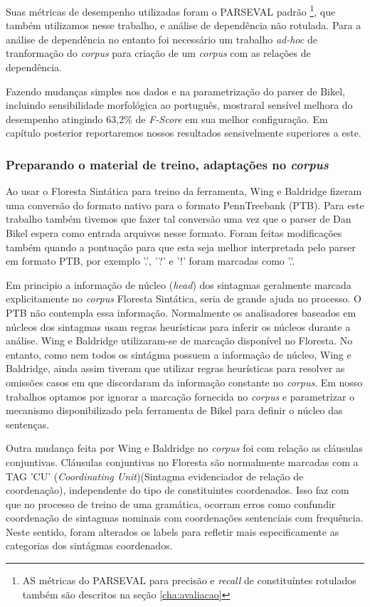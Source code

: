 Suas métricas de desempenho utilizadas foram o PARSEVAL padrão \footnote{AS métricas do PARSEVAL para precisão e \emph{recall} de constituíntes rotulados também são descritos na seção \ref{cha:avaliacao}}, que também utilizamos nesse trabalho, e análise de dependência não rotulada. Para a análise de dependência no entanto foi necessário um trabalho \emph{ad-hoc} de tranformação do \emph{corpus} para criação de um \emph{corpus} com as relações de dependência.

Fazendo mudanças simples nos dados e na parametrização do parser de Bikel, incluindo sensibilidade morfológica ao português, mostraral sensível melhora do desempenho atingindo 63,2{\%} de \emph{F-Score} em sua melhor configuração. Em capítulo posterior reportaremos nossos resultados sensivelmente superiores a este.


\subsubsection{Preparando o material de treino, adaptações no \emph{corpus}} %
\label{sec:wing_baldridge_adapt_corpus}

Ao usar o Floresta Sintática para treino da ferramenta, Wing e Baldridge fizeram uma conversão do formato nativo para o formato PennTreebank (PTB). Para este trabalho também tivemos que fazer tal conversão uma vez que o parser de Dan Bikel espera como entrada arquivos nesse formato. Foram feitas modificações também quando a pontuação para que esta seja melhor interpretada pelo parser em formato PTB, por exemplo '.', '?' e '!' foram marcadas como '.'. 

Em principio a informação de núcleo (\emph{head}) dos sintagmas geralmente marcada explicitamente no \emph{corpus} Floresta Sintática, seria de grande ajuda no processo. O PTB não contempla essa informação. Normalmente os analisadores baseados em núcleos dos sintagmas usam regras heurísticas para inferir os núcleos durante a análise. Wing e Baldridge utilizaram-se de marcação disponível no Floresta. No entanto, como nem todos os sintágma possuem a informação de núcleo, Wing e Baldridge, ainda assim tiveram que utilizar regras heurísticas para resolver as omissões casos em que discordaram da informação constante no \emph{corpus}. Em nosso trabalhos optamos por ignorar a marcação fornecida no \emph{corpus} e parametrizar o mecanismo disponibilizado pela ferramenta de Bikel para definir o núcleo das sentenças.

Outra mudança feita por Wing e Baldridge no \emph{corpus} foi com relação as cláusulas conjuntivas. Cláusulas conjuntivas no Floresta são normalmente marcadas com a TAG 'CU' (\emph{Coordinating Unit})(Sintagma evidenciador de relação de coordenação), independente do tipo de constituintes coordenados. Isso faz com que no processo de treino de uma gramática, ocorram erros como confundir coordenação de sintagmas nominais com coordenações sentenciais com frequência. Neste sentido, foram alterados os labels para refletir mais especificamente as categorias dos sintágmas coordenados.

